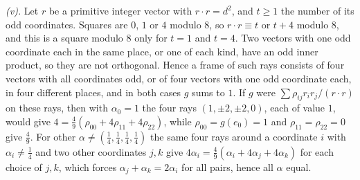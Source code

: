 \emph{(v).} Let $r$ be a primitive integer vector with $r \cdot r = d^{2}$, and $t \ge 1$ the number of its odd coordinates. Squares are $0$, $1$ or $4$ modulo $8$, so $r \cdot r \equiv t$ or $t + 4$ modulo $8$, and this is a square modulo $8$ only for $t = 1$ and $t = 4$. Two vectors with one odd coordinate each in the same place, or one of each kind, have an odd inner product, so they are not orthogonal. Hence a frame of such rays consists of four vectors with all coordinates odd, or of four vectors with one odd coordinate each, in four different places, and in both cases $g$ sums to $1$. If $g$ were $\sum\rho_{ij}r_{i}r_{j}/(r \cdot r)$ on these rays, then with $\alpha_{0} = 1$ the four rays $(1, \pm 2, \pm 2, 0)$, each of value $1$, would give $4 = \tfrac49(\rho_{00} + 4\rho_{11} + 4\rho_{22})$, while $\rho_{00} = g(e_{0}) = 1$ and $\rho_{11} = \rho_{22} = 0$ give $\tfrac49$. For other $\alpha \ne (\tfrac14, \tfrac14, \tfrac14, \tfrac14)$ the same four rays around a coordinate $i$ with $\alpha_{i} \ne \tfrac14$ and two other coordinates $j, k$ give $4\alpha_{i} = \tfrac49(\alpha_{i} + 4\alpha_{j} + 4\alpha_{k})$ for each choice of $j, k$, which forces $\alpha_{j} + \alpha_{k} = 2\alpha_{i}$ for all pairs, hence all $\alpha$ equal.
